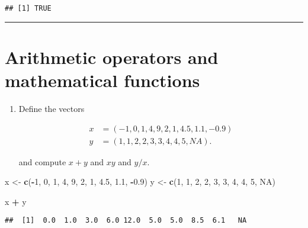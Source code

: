 \documentclass[]{article}
\newenvironment{Shaded}{\begin{snugshade}}{\end{snugshade}}
\newcommand{\KeywordTok}[1]{\textcolor[rgb]{0.13,0.29,0.53}{\textbf{#1}}}
\newcommand{\DecValTok}[1]{\textcolor[rgb]{0.00,0.00,0.81}{#1}}
\newcommand{\FloatTok}[1]{\textcolor[rgb]{0.00,0.00,0.81}{#1}}
\newcommand{\StringTok}[1]{\textcolor[rgb]{0.31,0.60,0.02}{#1}}
\newcommand{\OtherTok}[1]{\textcolor[rgb]{0.56,0.35,0.01}{#1}}
\newcommand{\OperatorTok}[1]{\textcolor[rgb]{0.81,0.36,0.00}{\textbf{#1}}}
\newcommand{\NormalTok}[1]{#1}
\providecommand{\tightlist}{%
  \setlength{\itemsep}{0pt}\setlength{\parskip}{0pt}}
\begin{document}
\begin{verbatim}
## [1] TRUE
\end{verbatim}

\begin{center}\rule{0.5\linewidth}{\linethickness}\end{center}

\section{Arithmetic operators and mathematical
functions}\label{arithmetic-operators-and-mathematical-functions}

\begin{enumerate}
\def\labelenumi{\arabic{enumi}.}
\tightlist
\item
  Define the vectors

  \begin{align*}
  x &=\left( -1,0,1,4,9,2,1,4.5,1.1,-0.9\right) \\
  y &=\left( 1,1,2,2,3,3,4,4,5,NA\right) .
  \end{align*}

  and compute \(x+y\) and \(xy\) and \(y/x\).
\end{enumerate}

\begin{Shaded}
\begin{Highlighting}[]
\NormalTok{x <-}\StringTok{ }\KeywordTok{c}\NormalTok{(}\OperatorTok{-}\DecValTok{1}\NormalTok{, }\DecValTok{0}\NormalTok{, }\DecValTok{1}\NormalTok{, }\DecValTok{4}\NormalTok{, }\DecValTok{9}\NormalTok{, }\DecValTok{2}\NormalTok{, }\DecValTok{1}\NormalTok{, }\FloatTok{4.5}\NormalTok{, }\FloatTok{1.1}\NormalTok{, }\OperatorTok{-}\FloatTok{0.9}\NormalTok{)}
\NormalTok{y <-}\StringTok{ }\KeywordTok{c}\NormalTok{(}\DecValTok{1}\NormalTok{, }\DecValTok{1}\NormalTok{, }\DecValTok{2}\NormalTok{, }\DecValTok{2}\NormalTok{, }\DecValTok{3}\NormalTok{, }\DecValTok{3}\NormalTok{, }\DecValTok{4}\NormalTok{, }\DecValTok{4}\NormalTok{, }\DecValTok{5}\NormalTok{, }\OtherTok{NA}\NormalTok{)}
\end{Highlighting}
\end{Shaded}

\begin{Shaded}
\begin{Highlighting}[]
\NormalTok{x }\OperatorTok{+}\StringTok{ }\NormalTok{y}
\end{Highlighting}
\end{Shaded}

\begin{verbatim}
##  [1]  0.0  1.0  3.0  6.0 12.0  5.0  5.0  8.5  6.1   NA
\end{verbatim}
\end{document}
